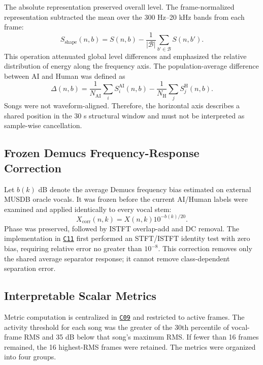 \documentclass[11pt,a4paper]{article}
\newcommand{\coderef}[1]{\hyperlink{code:#1}{\texttt{#1}}}
\begin{document}
The absolute representation preserved overall level. The frame-normalized representation subtracted the mean over the 300 Hz--20 kHz bands from each frame:
\begin{equation}
S_{\mathrm{shape}}(n,b)=S(n,b)-\frac{1}{|\mathcal{B}|}\sum_{b'\in\mathcal{B}}S(n,b').
\label{eq:shape}
\end{equation}
This operation attenuated global level differences and emphasized the relative distribution of energy along the frequency axis. The population-average difference between AI and Human was defined as
\begin{equation}
\Delta(n,b)=\frac{1}{N_{\mathrm{AI}}}\sum_i S_i^{\mathrm{AI}}(n,b)
-\frac{1}{N_{\mathrm{H}}}\sum_j S_j^{\mathrm{H}}(n,b).
\label{eq:average-diff}
\end{equation}
Songs were not waveform-aligned. Therefore, the horizontal axis describes a shared position in the 30 s structural window and must not be interpreted as sample-wise cancellation.

\subsection{Frozen Demucs Frequency-Response Correction}

Let $b(k)$ dB denote the average Demucs frequency bias estimated on external MUSDB oracle vocals. It was frozen before the current AI/Human labels were examined and applied identically to every vocal stem:
\begin{equation}
X_{\mathrm{corr}}(n,k)=X(n,k)10^{-b(k)/20}.
\label{eq:bias-correction}
\end{equation}
Phase was preserved, followed by ISTFT overlap-add and DC removal. The implementation in \coderef{C11} first performed an STFT/ISTFT identity test with zero bias, requiring relative error no greater than $10^{-8}$. This correction removes only the shared average separator response; it cannot remove class-dependent separation error.

\subsection{Interpretable Scalar Metrics}

Metric computation is centralized in \coderef{C09} and restricted to active frames. The activity threshold for each song was the greater of the 30th percentile of vocal-frame RMS and 35 dB below that song's maximum RMS. If fewer than 16 frames remained, the 16 highest-RMS frames were retained. The metrics were organized into four groups.
\end{document}
